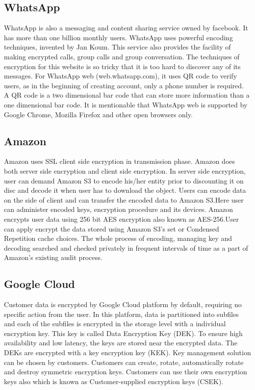 \documentclass[12pt,a4paper,conference]{IEEEtran}
\begin{document}
\subsection{WhatsApp}
WhatsApp is also a messaging and content sharing service owned by facebook. It has more than one billion monthly users. WhatsApp uses powerful encoding techniques, invented by Jan Koum. This service also provides the facility of making encrypted calls, group calls and group conversation. The techniques of encryption for this website is so tricky that it is too hard to discover any of its messages. For WhatsApp web (web.whatsapp.com), it uses QR code to verify users, as in the beginning of creating account, only a phone number is required. A QR code is a two dimensional bar code that can store more information than a one dimensional bar code. It is mentionable that WhatsApp web is supported by Google Chrome, Mozilla Firefox and other open browsers only. \autocite{neha16}

\subsection{Amazon}
Amazon uses SSL client side encryption in transmission phase. Amazon does both server side encryption and client side encryption. In server side encryption, user can demand Amazon S3 to encode his/her entity prior to discounting it on disc and decode it when user has to download the object. Users can encode data on the side of client and can transfer the encoded data to Amazon S3.Here user can administer encoded keys, encryption procedure and its devices. Amazon encrypts user data using 256 bit AES encryption also known as AES-256.User can apply encrypt the data stored using Amazon S3’s set or Condensed Repetition cache choices. The whole process of encoding, managing key and decoding searched and checked privately in frequent intervals of time as a part of Amazon’s existing audit process.  \autocite{neha16}

\subsection{Google Cloud}

Customer data is encrypted by Google Cloud platform by default, requiring no specific action from the user. In this platform, data is partitioned into subfiles and each of the subfiles is encrypted in the storage level with a individual encryption key. This key is called Data Encryption Key (DEK). To ensure high availability and low latency, the keys are stored near the encrypted data. The DEKs are encrypted with a key encryption key (KEK). Key management solution can be chosen by customers. Customers can create, rotate, automatically rotate and destroy symmetric encryption keys. Customers can use their own encryption keys also which is known as Customer-supplied encryption keys (CSEK). 
\end{document}
